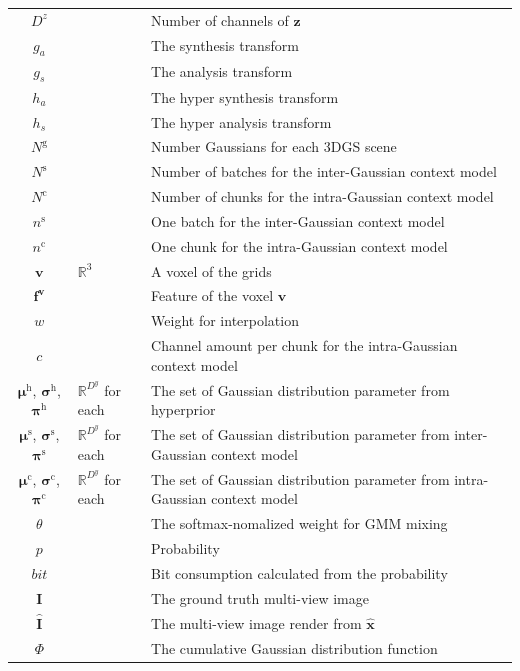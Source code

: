\documentclass{article} %
\begin{document}
\begin{table}[H]
\begin{tabular}{cll}
        $D^z$ &&Number of channels of $\bm{z}$  \\
        $g_a$ &&The synthesis transform  \\
        $g_s$ &&The analysis transform  \\
        $h_a$ &&The hyper synthesis transform  \\
        $h_s$ &&The hyper analysis transform  \\
        $N^\text{g}$ &&Number Gaussians for each 3DGS scene  \\
        $N^\text{s}$ &&Number of batches for the inter-Gaussian context model  \\
        $N^\text{c}$ &&Number of chunks for the intra-Gaussian context model  \\
        $n^\text{s}$ &&One batch for the inter-Gaussian context model  \\
        $n^\text{c}$ &&One chunk for the intra-Gaussian context model  \\
        $\bm{v}$ &$\mathbb{R}^{3}$&A voxel of the grids  \\
        $\bm{f}^{\bm{v}}$ && Feature of the voxel $\bm{v}$  \\
        $w$ && Weight for interpolation  \\
        $c$ &&Channel amount per chunk for the intra-Gaussian context model \\
        $\bm{\mu}^\text{h}$, $\bm{\sigma}^\text{h}$, $\bm{\pi}^\text{h}$ &$\mathbb{R}^{D^y}$ for each& The set of Gaussian distribution parameter from hyperprior \\
        $\bm{\mu}^\text{s}$, $\bm{\sigma}^\text{s}$, $\bm{\pi}^\text{s}$ &$\mathbb{R}^{D^y}$ for each& The set of Gaussian distribution parameter from inter-Gaussian context model \\
        $\bm{\mu}^\text{c}$, $\bm{\sigma}^\text{c}$, $\bm{\pi}^\text{c}$ &$\mathbb{R}^{D^y}$ for each& The set of Gaussian distribution parameter from intra-Gaussian context model \\
        $\theta$ &&The softmax-nomalized weight for GMM mixing  \\
        $p$ &&Probability \\
        $bit$ &&Bit consumption calculated from the probability  \\
        $\bm{I}$ &&The ground truth multi-view image  \\
        $\hat{\bm{I}}$ &&The multi-view image render from $\hat{\bm{x}}$  \\
        $\Phi$ &&The cumulative Gaussian distribution function \\

\end{tabular}
\end{table}
\end{document}
